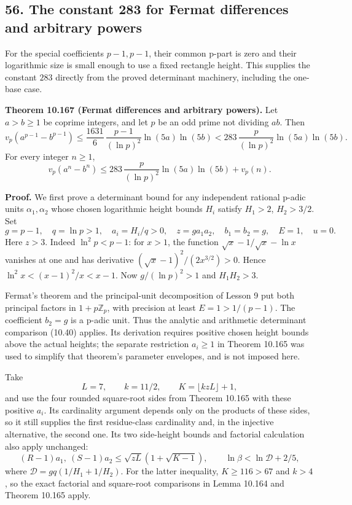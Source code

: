 \documentclass[
  11pt,
  a4paper,
]{article}
\begin{document}
\subsection{56. The constant 283 for Fermat differences and arbitrary
powers}\label{the-constant-283-for-fermat-differences-and-arbitrary-powers}

For the special coefficients \(p-1,p-1\), their common p-part is zero
and their logarithmic size is small enough to use a fixed rectangle
height. This supplies the constant \(283\) directly from the proved
determinant machinery, including the one-base case.

\textbf{Theorem 10.167 (Fermat differences and arbitrary powers).} Let
\(a>b\ge1\) be coprime integers, and let \(p\) be an odd prime not
dividing \(ab\). Then \[
v_p(a^{p-1}-b^{p-1})
\le\frac{1631}{6}\,\frac{p-1}{(\ln p)^2}\ln(5a)\ln(5b)
<283\,\frac p{(\ln p)^2}\ln(5a)\ln(5b).
\tag{10.581}
\] For every integer \(n\ge1\), \[
v_p(a^n-b^n)
\le283\,\frac p{(\ln p)^2}\ln(5a)\ln(5b)+v_p(n).
\tag{10.582}
\]

\textbf{Proof.} We first prove a determinant bound for any independent
rational p-adic units \(\alpha_1,\alpha_2\) whose chosen logarithmic
height bounds \(H_i\) satisfy \(H_1>2\), \(H_2>3/2\). Set \[
g=p-1,\quad q=\ln p>1,\quad
a_i=H_i/q>0,\quad z=ga_1a_2,\quad
b_1=b_2=g,\quad E=1,\quad u=0.
\tag{10.583}
\] Here \(z>3\). Indeed \(\ln^2p<p-1\): for \(x>1\), the function
\(\sqrt x-1/\sqrt x-\ln x\) vanishes at one and has derivative
\((\sqrt x-1)^2/(2x^{3/2})>0\). Hence \(\ln^2x<(x-1)^2/x<x-1\). Now
\(g/(\ln p)^2>1\) and \(H_1H_2>3\).

Fermat's theorem and the principal-unit decomposition of Lesson 9 put
both principal factors in \(1+p\mathbb Z_p\), with precision at least
\(E=1>1/(p-1)\). The coefficient \(b_2=g\) is a p-adic unit. Thus the
analytic and arithmetic determinant comparison (10.40) applies. Its
derivation requires positive chosen height bounds above the actual
heights; the separate restriction \(a_i\ge1\) in Theorem 10.165 was used
to simplify that theorem's parameter envelopes, and is not imposed here.

Take \[
L=7,\qquad k=11/2,\qquad K=\lfloor kzL\rfloor+1,
\tag{10.584}
\] and use the four rounded square-root sides from Theorem 10.165 with
these positive \(a_i\). Its cardinality argument depends only on the
products of these sides, so it still supplies the first residue-class
cardinality and, in the injective alternative, the second one. Its two
side-height bounds and factorial calculation also apply unchanged: \[
(R-1)a_1,\ (S-1)a_2
\le\sqrt{zL}(1+\sqrt{K-1}),\qquad
\ln\beta<\ln\mathcal D+2/5,
\tag{10.585}
\] where \(\mathcal D=gq(1/H_1+1/H_2)\). For the latter inequality,
\(K\ge116>67\) and \(k>4\), so the exact factorial and square-root
comparisons in Lemma 10.164 and Theorem 10.165 apply.
\end{document}
